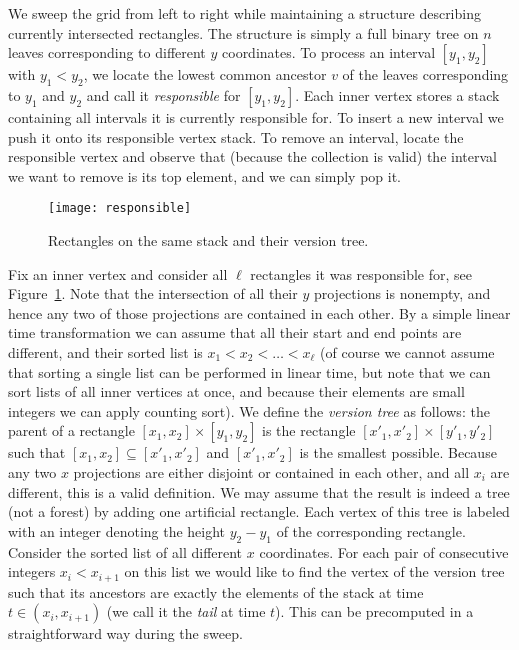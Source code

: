 \documentclass[runningheads]{llncs}
\begin{document}
We sweep the grid from left to right while maintaining a structure describing currently intersected rectangles. The structure is simply a full binary tree on $n$ leaves corresponding to different $y$ coordinates. To process an interval $[y_1,y_2]$ with
$y_1<y_2$, we locate the lowest common ancestor $v$ of the leaves corresponding to $y_1$ and $y_2$ and call it {\it responsible} for $[y_{1},y_{2}]$. Each inner vertex stores a stack containing all intervals it is currently responsible for. To insert a new interval we push it onto its responsible vertex stack. To remove an interval, locate the responsible vertex and observe that (because the collection is valid) the interval we want to remove is its top element, and we can simply pop it.

\begin{figure}[t]
\centering
\texttt{[image: responsible]}
\caption{Rectangles on the same stack and their version tree.}
\label{figure:responsible}
\end{figure}

Fix an inner vertex and consider all $\ell$ rectangles it was responsible for, see Figure~\ref{figure:responsible}. Note that the intersection of
all their $y$ projections is nonempty, and hence any two of those projections are contained in each other. By a simple linear time transformation we can assume that all their start and end points are different, and their sorted list is $x_1<x_2<\ldots<x_\ell$ (of course we cannot assume that sorting a single list can be performed in linear time, but note that we can sort lists of all inner vertices at once, and because their elements are small integers we can apply counting sort). We define the \emph{version tree} as follows: the parent of a rectangle $[x_1,x_2]\times [y_1,y_2]$ is the rectangle $[x'_1,x'_2]\times [y'_1,y'_2]$ such that $[x_1,x_2]\subseteq [x'_1,x'_2]$ and $[x'_1,x'_2]$ is the smallest possible. Because any two $x$ projections are either disjoint or contained in each other, and all $x_i$ are different, this is a valid definition. We
may assume that the result is indeed a tree (not a forest) by adding one artificial rectangle. Each vertex of this tree is labeled with an integer denoting the height $y_2-y_1$ of the corresponding rectangle. Consider the sorted list of all different $x$ coordinates. For each pair of consecutive
integers $x_i<x_{i+1}$ on this list we would like to find the vertex of the version tree such that its ancestors are exactly the elements of the stack at time $t\in(x_i,x_{i+1})$ (we call it the \emph{tail} at time $t$). This can be precomputed in a straightforward way during the sweep. 
\end{document}
